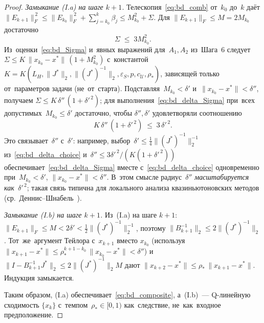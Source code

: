\begin{proof}
\textit{Замыкание (I.a) на шаге $k+1$.} Телескопия~\eqref{eq:bd_comb} от~$k_0$ до~$k$ даёт
$\|E_{k+1}\|_F^{\,2}\le\|E_{k_0}\|_F^{\,2}+\sum_{j=k_0}^{k}\beta_j\le M_{k_0}^2+\Sigma$.
Для $\|E_{k+1}\|_F\le M=2M_{k_0}$ достаточно
\begin{equation}\label{eq:bd_delta_Sigma}
  \Sigma\;\le\;3M_{k_0}^2.
\end{equation}
Из~оценки~\eqref{eq:bd_Sigma} и~явных выражений для~$A_1,A_2$ из~Шага~6
следует $\Sigma\le K\,\|x_{k_0}-x^{*}\|\,(1+M_{k_0}^2)$ с~константой
$K=K(L_H,\|J^{*}\|_2,\|(J^{*})^{-1}\|_2,\varepsilon_S,p,c_{\mathcal U},\rho_*)$,
зависящей только от~параметров задачи (не~от~старта).
Подставляя~$M_{k_0}<\delta'$ и~$\|x_{k_0}-x^{*}\|<\delta''$, получаем
$\Sigma\le K\,\delta''\,(1+\delta'^{\,2})$; для выполнения~\eqref{eq:bd_delta_Sigma}
при~всех допустимых~$M_{k_0}\le\delta'$ достаточно, чтобы $\delta'',\delta'$
удовлетворяли соотношению
\begin{equation}\label{eq:bd_delta_link}
  K\,\delta''\,(1+\delta'^{\,2})\;\le\;3\,\delta'^{\,2}.
\end{equation}
Это связывает~$\delta''$ с~$\delta'$: например, выбор~$\delta'\le\tfrac14\|(J^{*})^{-1}\|_2^{-1}$
из~\eqref{eq:bd_delta_choice} и~$\delta''\le 3\delta'^{\,2}/(K(1+\delta'^{\,2}))$
обеспечивает~\eqref{eq:bd_delta_Sigma} вместе с~\eqref{eq:bd_delta_choice}
одновременно при~$M_{k_0}<\delta'$, $\|x_{k_0}-x^{*}\|<\delta''$.
В~этом смысле радиус~$\delta''$ \emph{масштабируется как~$\delta'^{\,2}$};
такая связь типична для локального анализа квазиньютоновских методов
(ср.\ Деннис--Шнабель~\cite[Th.~8.2.2]{dennis1996}).

\textit{Замыкание (I.b) на шаге $k+1$.} Из~(I.a) на шаге $k+1$: $\|E_{k+1}\|_F\le M<2\delta'<\tfrac12\|(J^{*})^{-1}\|_2^{-1}$,
поэтому $\|B_{k+1}^{-1}\|_2\le 2\|(J^{*})^{-1}\|_2$. Тот~же~аргумент Тейлора
с~$x_{k+1}$ вместо $x_{k_0}$ (используя $\|x_{k+1}-x^{*}\|\le\rho_*^{k+1-k_0}\,\|x_{k_0}-x^{*}\|<\delta''$)
и~$\|I-B_{k+1}^{-1}J^{*}\|_2\le 2\|(J^{*})^{-1}\|_2 M$ дают
$\|x_{k+2}-x^{*}\|\le\rho_*\,\|x_{k+1}-x^{*}\|$. Индукция замыкается.

\smallskip
Таким образом, (I.a) обеспечивает~\eqref{eq:bd_composite}, а~(I.b)~--- Q-линейную
сходимость $\{x_k\}$ с~темпом~$\rho_*\in[0,1)$ как~следствие, не~как~входное
предположение.
\end{proof}


